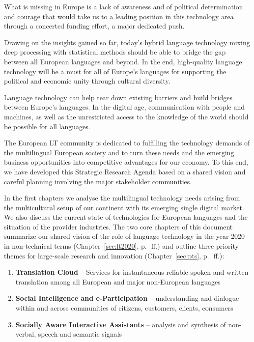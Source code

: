 \documentclass[10pt, plain]{../../metanetpaper}
\begin{document}
\begin{multicols}{2}
What is missing in Europe is a lack of awareness and of political determination and courage that would take us to a leading position in this technology area through a concerted funding effort, a major dedicated push.

Drawing on the insights gained so far, today’s hybrid language technology mixing deep processing with statistical methods should be able to bridge the gap between all European languages and beyond. In the end, high-quality language technology will be a must for all of Europe's languages for supporting the political and economic unity through cultural diversity.

Language technology can help tear down existing barriers and build bridges between Europe’s languages. In the digital age, communication with people and machines, as well as the unrestricted access to the knowledge of the world should be possible for all languages.


The European LT community is dedicated to fulfilling the technology demands of the multilingual European society and to turn these needs and the emerging business opportunities into competitive advantages for our economy. To this end, we have developed this Strategic Research Agenda based on a shared vision and careful planning involving the major stakeholder communities.

In the first chapters we analyse the multilingual technology needs arising from the multicultural setup of our continent with its emerging single digital market. We also discuss the current state of technologies for European languages and the situation of the provider industries. The two core chapters of this document summarize our shared vision of the role of language technology in the year 2020 in non-technical terms (Chapter~\ref{sec:lt2020}, p.~\pageref{sec:lt2020}\,ff.) and outline three priority themes for large-scale research and innovation (Chapter~\ref{sec:pts}, p.~\pageref{sec:pts}\,ff.):

\begin{enumerate}
\item \textbf{Translation Cloud} -- Services for instantaneous reliable spoken and written translation among all European and major non-European languages
\item \textbf{Social Intelligence and e-Participation} -- understanding and dialogue within and across communities of citizens, customers, clients, consumers
\item \textbf{Socially Aware Interactive Assistants} -- analysis and synthesis of non-verbal, speech and semantic signals
\end{enumerate}
 

\end{multicols}
\end{document}
